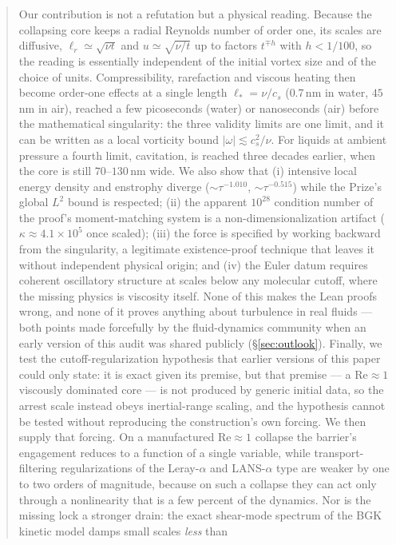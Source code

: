 \documentclass[11pt,a4paper]{article}
\begin{document}
\begin{abstract}
Our contribution is not a refutation but a physical reading. Because the collapsing core keeps a
radial Reynolds number of order one, its scales are diffusive, $\ell_r\simeq\sqrt{\nu t}$ and
$u\simeq\sqrt{\nu/t}$ up to factors $t^{\mp h}$ with $h<1/100$, so the reading is essentially
independent of the initial vortex size and of the choice of units. Compressibility, rarefaction and
viscous heating then become order-one effects at a single length $\ell_*=\nu/c_s$ ($0.7$\,nm in
water, $45$\,nm in air), reached a few picoseconds (water) or nanoseconds (air) before the
mathematical singularity: the three validity limits are one limit, and it can be written as a local
vorticity bound $|\omega|\lesssim c_s^2/\nu$. For liquids at ambient pressure a fourth limit,
cavitation, is reached three decades earlier, when the core is still $70$--$130$\,nm wide. We also show
that (i) intensive local energy density and enstrophy diverge ($\sim\tau^{-1.010}$,
$\sim\tau^{-0.515}$) while the Prize's global $L^2$ bound is respected; (ii) the apparent $10^{28}$
condition number of the proof's moment-matching system is a non-dimensionalization artifact
($\kappa\approx4.1\times10^5$ once scaled); (iii) the force is specified by working backward from
the singularity, a legitimate existence-proof technique that leaves it without independent physical
origin; and (iv) the Euler datum requires coherent oscillatory structure at scales below any
molecular cutoff, where the missing physics is viscosity itself. None of this makes the Lean proofs
wrong, and none of it proves anything about turbulence in real fluids --- both points made
forcefully by the fluid-dynamics community when an early version of this audit was shared publicly
(\S\ref{sec:outlook}). Finally, we test the cutoff-regularization hypothesis that earlier versions
of this paper could only state: it is exact given its premise, but that premise --- a
$\mathrm{Re}\approx1$ viscously dominated core --- is not produced by generic initial data, so the
arrest scale instead obeys inertial-range scaling, and the hypothesis cannot be tested without
reproducing the construction's own forcing. We then supply that forcing. On a manufactured
$\mathrm{Re}\approx1$ collapse the barrier's engagement reduces to a function of a single
variable, while transport-filtering regularizations of the Leray-$\alpha$ and LANS-$\alpha$ type
are weaker by one to two orders of magnitude, because on such a collapse they can act only
through a nonlinearity that is a few percent of the dynamics. Nor is the missing lock a stronger
drain: the exact shear-mode spectrum of the BGK kinetic model damps small scales \emph{less} than

\end{abstract}
\end{document}
